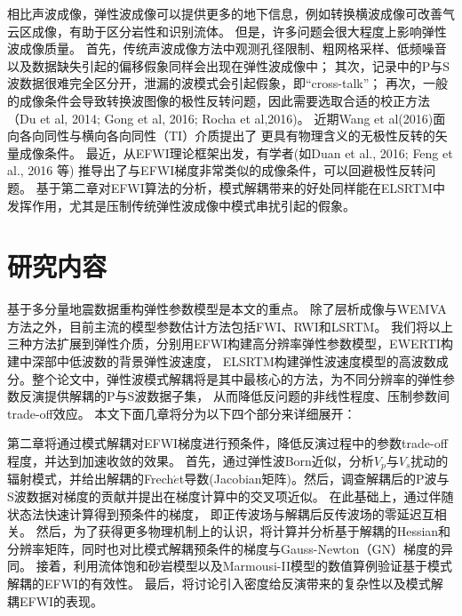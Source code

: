 相比声波成像，弹性波成像可以提供更多的地下信息，例如转换横波成像可改善气云区成像，有助于区分岩性和识别流体。
但是，许多问题会很大程度上影响弹性波成像质量。
首先，传统声波成像方法中观测孔径限制、粗网格采样、低频噪音以及数据缺失引起的偏移假象同样会出现在弹性波成像中；
其次，记录中的P与S波数据很难完全区分开，泄漏的波模式会引起假象，即“cross-talk”；
再次，一般的成像条件会导致转换波图像的极性反转问题，因此需要选取合适的校正方法（Du et al,
2014\cite{DuEtAl2014}; Gong et al, 2016\cite{GongEtAl2016}; Rocha et al,2016\cite{RochaEtAl2016a})。
近期Wang et al(2016)\cite{WangChenlongEtAl2016}面向各向同性与横向各向同性（TI）介质提出了
更具有物理含义的无极性反转的矢量成像条件。
最近，从EFWI理论框架出发，有学者(如Duan et al., 2016\cite{Duan2016}; Feng et al., 2016\cite{Feng2016} 等)
推导出了与EFWI梯度非常类似的成像条件，可以回避极性反转问题。
基于第二章对EFWI算法的分析，模式解耦带来的好处同样能在ELSRTM中发挥作用，尤其是压制传统弹性波成像中模式串扰引起的假象。


\section{研究内容}
基于多分量地震数据重构弹性参数模型是本文的重点。
除了层析成像与WEMVA方法之外，目前主流的模型参数估计方法包括FWI、RWI和LSRTM。
我们将以上三种方法扩展到弹性介质，分别用EFWI构建高分辨率弹性参数模型，EWERTI构建中深部中低波数的背景弹性波速度，
ELSRTM构建弹性波速度模型的高波数成分。整个论文中，弹性波模式解耦将是其中最核心的方法，为不同分辨率的弹性参数反演提供解耦的P与S波数据子集，
从而降低反问题的非线性程度、压制参数间trade-off效应。
本文下面几章将分为以下四个部分来详细展开：

第二章将通过模式解耦对EFWI梯度进行预条件，降低反演过程中的参数trade-off程度，并达到加速收敛的效果。
首先，通过弹性波Born近似，分析$V_p$与$V_s$扰动的
辐射模式，并给出解耦的Frech{$\acute{e}$}t导数(Jacobian矩阵)。然后，调查解耦后的P波与S波数据对梯度的贡献并提出在梯度计算中的交叉项近似。
在此基础上，通过伴随状态法快速计算得到预条件的梯度，
即正传波场与解耦后反传波场的零延迟互相关。
然后，为了获得更多物理机制上的认识，将计算并分析基于解耦的Hessian和分辨率矩阵，同时也对比模式解耦预条件的梯度与Gauss-Newton（GN）梯度的异同。
接着，利用流体饱和砂岩模型以及Marmousi-II模型的数值算例验证基于模式解耦的EFWI的有效性。
最后，将讨论引入密度给反演带来的复杂性以及模式解耦EFWI的表现。

